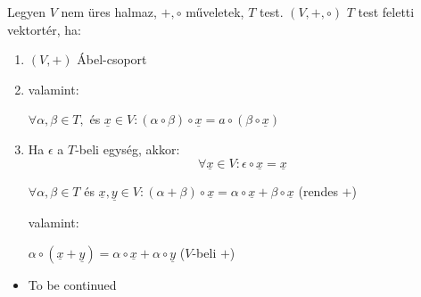\documentclass[11pt,a4paper]{article}
\begin{document}
\begin{tcolorbox}[colback=blue!5!white,colframe=blue!70!black,title= 3. Vektortér]
    Legyen \(V\) nem üres halmaz, \(+, \circ \) műveletek, \(T\) test. \((V, +, \circ)\) \(T\) test feletti vektortér, ha:
    \begin{enumerate}
        \item \((V, +)\) Ábel-csoport
        \item valamint:
        \begin{center}
        \(\forall \alpha, \beta \in T,\) és \(\underline{x} \in V : (\alpha \circ \beta) \circ \underline{x} = a\circ (\beta \circ \underline{x})\)
        \end{center}
        \item Ha \(\epsilon\)  a \(T\)-beli egység, akkor:
        $$\forall \underline{x} \in V: \epsilon \circ \underline{x} = \underline{x}$$
        \begin{center}
            \(\forall \alpha, \beta \in T \) és \(\underline{x},\underline{y} \in V: (\alpha +\beta) \circ \underline{x} = \alpha \circ \underline{x} + \beta \circ \underline{x}\) (rendes \(+\))
        \end{center}
        valamint: 
        \begin{center}
            \(\alpha \circ (\underline{x}+\underline{y}) = \alpha \circ \underline{x} + \alpha \circ \underline{y}\) (\(V\)-beli \(+\))
        \end{center}
    \end{enumerate}
\end{tcolorbox}

\begin{tcolorbox}[colback=blue!5!white,colframe=blue!70!black,title= 4. Vektorok lineáris függősége és függetlensége]
    \begin{itemize}
        \item To be continued
    \end{itemize}
\end{tcolorbox}
\end{document}

